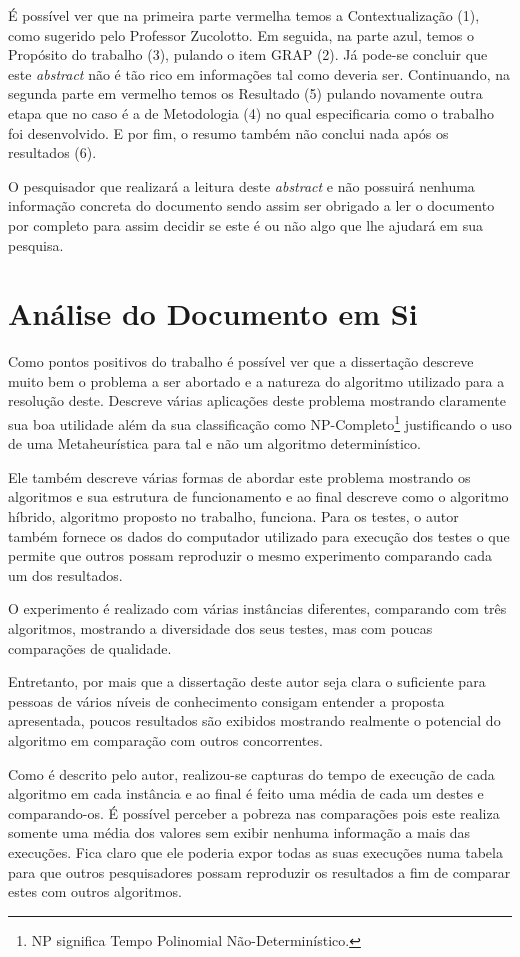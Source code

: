 \documentclass[portugues, brazil, a4paper,12pt]{article}
\begin{document}
	É possível ver que na primeira parte vermelha temos a Contextualização (1), como sugerido pelo Professor Zucolotto. Em seguida, na parte azul, temos o Propósito do trabalho (3), pulando o item GRAP (2). Já pode-se concluir que este \textit{abstract} não é tão rico em informações tal como deveria ser. Continuando, na segunda parte em vermelho temos os Resultado (5) pulando novamente outra etapa que no caso é a de Metodologia (4) no qual especificaria como o trabalho foi desenvolvido. E por fim, o resumo também não conclui nada após os resultados (6).
	
	O pesquisador que realizará a leitura deste \textit{abstract} e não possuirá nenhuma informação concreta do documento sendo assim ser obrigado a ler o documento por completo para assim decidir se este é ou não algo que lhe ajudará em sua pesquisa.
	
	
\section{Análise do Documento em Si}
	Como pontos positivos do trabalho é possível ver que a dissertação descreve muito bem o problema a ser abortado e a natureza do algoritmo utilizado para a resolução deste. Descreve várias aplicações deste problema mostrando claramente sua boa utilidade além da sua classificação como NP-Completo\footnote{NP significa Tempo Polinomial Não-Determinístico.} justificando o uso de uma Metaheurística para tal e não um algoritmo determinístico.
	
	Ele também descreve várias formas de abordar este problema mostrando os algoritmos e sua estrutura de funcionamento e ao final descreve como o algoritmo híbrido, algoritmo proposto no trabalho, funciona. Para os testes, o autor também fornece os dados do computador utilizado para execução dos testes o que permite que outros possam reproduzir o mesmo experimento comparando cada um dos resultados.
	
	O experimento é realizado com várias instâncias diferentes, comparando com três algoritmos, mostrando a diversidade dos seus testes, mas com poucas comparações de qualidade.
	
	Entretanto, por mais que a dissertação deste autor seja clara o suficiente para pessoas de vários níveis de conhecimento consigam entender a proposta apresentada, poucos resultados são exibidos mostrando realmente o potencial do algoritmo em comparação com outros concorrentes. 
	
	Como é descrito pelo autor, realizou-se capturas do tempo de execução de cada algoritmo em cada instância e ao final é feito uma média de cada um destes e comparando-os. É possível perceber a pobreza nas comparações pois este realiza somente uma média dos valores sem exibir nenhuma informação a mais das execuções. Fica claro que ele poderia expor todas as suas execuções numa tabela para que outros pesquisadores possam reproduzir os resultados a fim de comparar estes com outros algoritmos. 
	
\end{document}

